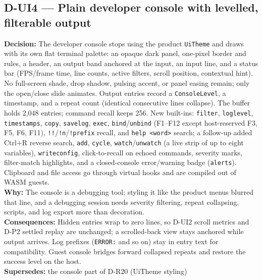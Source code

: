\subsection*{D-UI4 --- Plain developer console with levelled, filterable output}
\begin{decisionbox}[title={D-UI4 \quad 2026-09-23}]
\textbf{Decision:} The developer console stops using the product
\texttt{UiTheme} and draws with its own flat terminal palette: an opaque dark
panel, one-pixel border and rules, a header, an output band anchored at the
input, an input line, and a status bar (FPS/frame time, line counts, active
filters, scroll position, contextual hint). No full-screen shade, drop shadow,
pulsing accent, or panel easing remain; only the open/close slide animates.
Output entries record a \texttt{ConsoleLevel}, a timestamp, and a repeat count
(identical consecutive lines collapse). The buffer holds 2,048 entries;
command recall keeps 256. New built-ins: \texttt{filter}, \texttt{loglevel},
\texttt{timestamps}, \texttt{copy}, \texttt{savelog}, \texttt{exec},
\texttt{bind}/\texttt{unbind} (F1--F12 except host-reserved F3, F5, F6, F11),
\texttt{!!}/\texttt{!n}/\texttt{!prefix} recall, and \texttt{help <word>}
search; a follow-up added Ctrl+R reverse search, \texttt{add},
\texttt{cycle}, \texttt{watch}/\texttt{unwatch} (a live strip of up to eight
variables), \texttt{writeconfig}, click-to-recall on echoed commands,
severity marks, filter-match highlights, and a closed-console error/warning
badge (\texttt{alerts}). Clipboard and file access go through
 virtual hooks and are compiled out of WASM
guests.\\
\textbf{Why:} The console is a debugging tool; styling it like the product
menus blurred that line, and a debugging session needs severity filtering,
repeat collapsing, scripts, and log export more than decoration.\\
\textbf{Consequences:} Hidden entries wrap to zero lines, so D-UI2 scroll
metrics and D-P2 settled replay are unchanged; a scrolled-back view stays
anchored while output arrives. Log prefixes (\texttt{ERROR:} and so on) stay
in entry text for compatibility. Guest console bridges forward collapsed
repeats and restore the success level on the host.\\
\textbf{Supersedes:} the console part of D-R20 (UiTheme styling)
\end{decisionbox}

